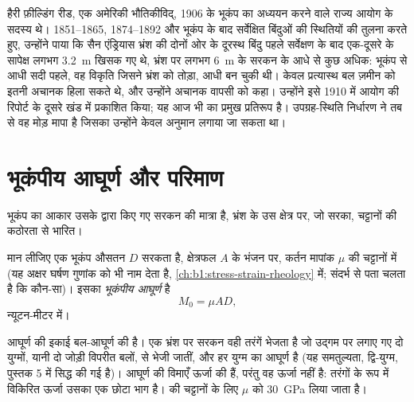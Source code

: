 \begin{history}[हैरी फ़ील्डिंग रीड और प्रत्यास्थ प्रतिक्षेप]
हैरी फ़ील्डिंग रीड, एक अमेरिकी भौतिकीविद्, 1906 के भूकंप का अध्ययन करने वाले राज्य आयोग के सदस्य थे। 1851–1865, 1874–1892 और भूकंप के बाद सर्वेक्षित बिंदुओं की स्थितियों की तुलना करते हुए, उन्होंने पाया कि सैन एंड्रियास भ्रंश की दोनों ओर के दूरस्थ बिंदु पहले सर्वेक्षण के बाद एक-दूसरे के सापेक्ष लगभग \qty{3.2}{m} खिसक गए थे, भ्रंश पर लगभग \qty{6}{m} के सरकन के आधे से कुछ अधिक: भूकंप से आधी सदी पहले, वह विकृति जिसने भ्रंश को तोड़ा, आधी बन चुकी थी। केवल प्रत्यास्थ बल ज़मीन को इतनी अचानक हिला सकते थे, और उन्होंने अचानक वापसी को  कहा। उन्होंने इसे 1910 में आयोग की रिपोर्ट के दूसरे खंड में प्रकाशित किया; यह आज भी  का प्रमुख प्रतिरूप है। उपग्रह-स्थिति निर्धारण ने तब से वह मोड़ मापा है जिसका उन्होंने केवल अनुमान लगाया जा सकता था।
\end{history}

\section{भूकंपीय आघूर्ण और परिमाण}\label{sec:b1:earthquake-source:moment}

भूकंप का आकार उसके द्वारा किए गए सरकन की मात्रा है, भ्रंश के उस क्षेत्र पर, जो सरका, चट्टानों की कठोरता से भारित।

\begin{definition}[भूकंपीय आघूर्ण]
\label{def:b1:earthquake-source:moment}
मान लीजिए एक भूकंप औसतन $D$ सरकता है, क्षेत्रफल $A$ के भंजन पर, कर्तन मापांक $\mu$ की चट्टानों में (यह अक्षर घर्षण गुणांक को भी नाम देता है, \cref{ch:b1:stress-strain-rheology} में; संदर्भ से पता चलता है कि कौन-सा)। इसका \emph{भूकंपीय आघूर्ण} है
\[
  M_0 = \mu A D ,
\]
न्यूटन-मीटर में।
\end{definition}

आघूर्ण की इकाई बल-आघूर्ण की है। एक भ्रंश पर सरकन वही तरंगें भेजता है जो उद्गम पर लगाए गए दो युग्मों, यानी दो जोड़ी विपरीत बलों, से भेजी जातीं, और  हर युग्म का आघूर्ण है (यह समतुल्यता, द्वि-युग्म, पुस्तक 5 में सिद्ध की गई है)। आघूर्ण की विमाएँ ऊर्जा की हैं, परंतु वह ऊर्जा नहीं है: तरंगों के रूप में विकिरित ऊर्जा उसका एक छोटा भाग है।  की चट्टानों के लिए $\mu$ को \qty{30}{GPa} लिया जाता है।

